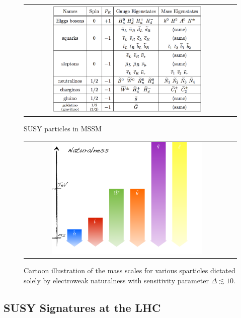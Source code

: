 \begin{figure}[tbh!]
	\centering
	\begin{tabular}{cc}
		\includegraphics[width=0.75\textwidth]{theory/pics/SUSY_particles_table.png}
	\end{tabular}
	\caption{SUSY particles in MSSM~\protect\cite{Martin:1997ns}}
	\label{fig:SUSY_particles_table}
\end{figure}

\begin{figure}[tbh!]
	\centering
	\begin{tabular}{cc}
		\includegraphics[width=0.75\textwidth]{theory/pics/SUSY_naturalness.png}
	\end{tabular}
	\caption{Cartoon illustration of the mass scales for various sparticles dictated solely by electroweak naturalness with sensitivity parameter $\Delta \lesssim 10$.}
	\label{fig:SUSY_naturalness}
\end{figure}




\subsection{SUSY Signatures at the LHC}
